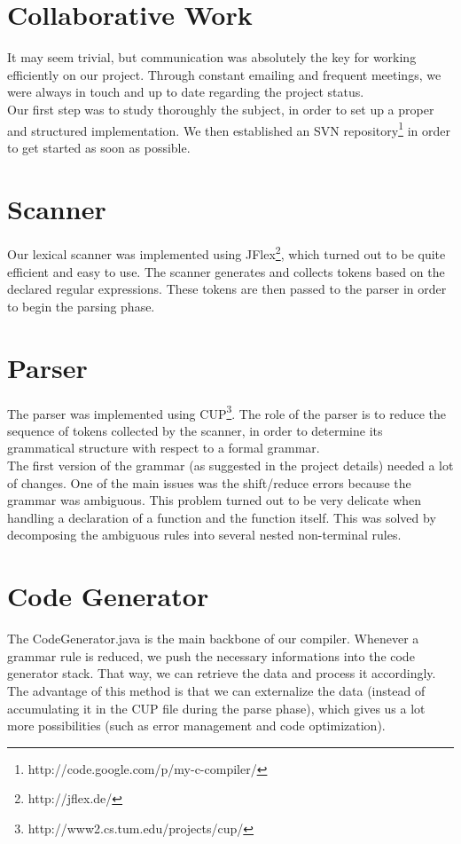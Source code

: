 \documentclass{article}
\begin{document}
\section{Collaborative Work}
It may seem trivial, but communication was absolutely the key for working efficiently on our project. Through constant emailing and frequent meetings, we were always in touch and up to date regarding the project status.\\
Our first step was to study thoroughly the subject, in order to set up a proper and structured implementation.
We then established an SVN repository\footnote{http://code.google.com/p/my-c-compiler/} in order to get started as soon as possible.

\section{Scanner}
Our lexical scanner was implemented using JFlex\footnote{http://jflex.de/}, which turned out to be quite efficient and easy to use. The scanner generates and collects tokens based on the declared regular expressions. These tokens are then passed to the parser in order to begin the parsing phase.

\section{Parser}
The parser was implemented using CUP\footnote{http://www2.cs.tum.edu/projects/cup/}. The role of the parser is to reduce the sequence of tokens collected by the scanner, in order to determine its grammatical structure with respect to a formal grammar.\\
The first version of the grammar (as suggested in the project details) needed a lot of changes. One of the main issues was the shift/reduce errors because the grammar was ambiguous. This problem turned out to be very delicate when handling a declaration of a function and the function itself. This was solved by decomposing the ambiguous rules into several nested non-terminal rules.

\section{Code Generator}
The CodeGenerator.java is the main backbone of our compiler. Whenever a grammar rule is reduced, we push the necessary informations into the code generator stack. That way, we can retrieve the data and process it accordingly. The advantage of this method is that we can externalize the data (instead of accumulating it in the CUP file during the parse phase), which gives us a lot more possibilities (such as error management and code optimization).
\end{document}
